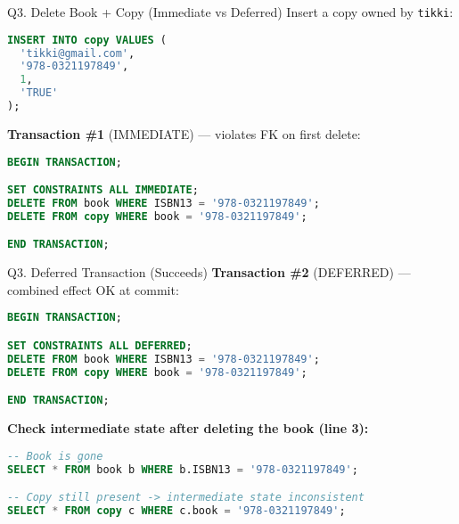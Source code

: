 \documentclass{beamer}
\begin{document}
\begin{frame}[fragile]{Q3. Delete Book + Copy (Immediate vs Deferred)}
Insert a copy owned by \texttt{tikki}:
\begin{lstlisting}[language=SQL]
INSERT INTO copy VALUES (
  'tikki@gmail.com',
  '978-0321197849',
  1,
  'TRUE'
);
\end{lstlisting}

\textbf{Transaction \#1} (IMMEDIATE) — violates FK on first delete:
\begin{lstlisting}[language=SQL]
BEGIN TRANSACTION;

SET CONSTRAINTS ALL IMMEDIATE;
DELETE FROM book WHERE ISBN13 = '978-0321197849';
DELETE FROM copy WHERE book = '978-0321197849';

END TRANSACTION;
\end{lstlisting}
\end{frame}

\begin{frame}[fragile]{Q3. Deferred Transaction (Succeeds)}
\textbf{Transaction \#2} (DEFERRED) — combined effect OK at commit:
\begin{lstlisting}[language=SQL]
BEGIN TRANSACTION;

SET CONSTRAINTS ALL DEFERRED;
DELETE FROM book WHERE ISBN13 = '978-0321197849';
DELETE FROM copy WHERE book = '978-0321197849';

END TRANSACTION;
\end{lstlisting}

\textbf{Check intermediate state after deleting the book (line 3):}
\begin{lstlisting}[language=SQL]
-- Book is gone
SELECT * FROM book b WHERE b.ISBN13 = '978-0321197849';

-- Copy still present -> intermediate state inconsistent
SELECT * FROM copy c WHERE c.book = '978-0321197849';
\end{lstlisting}
\end{frame}
\end{document}
